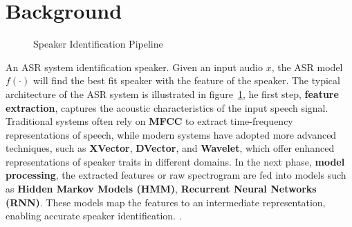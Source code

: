 \documentclass[conference]{IEEEtran}
\begin{document}
\section{Background}
\begin{figure}[H]
    \centering
    \label{fig:speaker_identification_pipeline}
    \caption{Speaker Identification Pipeline}
\end{figure}

An ASR system identification speaker. Given an input audio \(x\), the ASR model \(f(\cdot)\) will find the best fit speaker with the feature of the speaker. The typical architecture
of the ASR system is illustrated in figure~\ref{fig:speaker_identification_pipeline}, he first step, \textbf{feature extraction},
captures the acoustic characteristics of the input speech signal. Traditional systems often rely on \textbf{MFCC} to extract time-frequency representations of speech,
while modern systems have adopted more advanced techniques, such as \textbf{XVector}, \textbf{DVector}, and \textbf{Wavelet}, which offer enhanced representations of
speaker traits in different domains. In the next phase, \textbf{model processing}, the extracted features or raw spectrogram are fed into models such as \textbf{Hidden Markov Models (HMM)},
\textbf{Recurrent Neural Networks (RNN)}. These models map the features to an intermediate representation,
enabling accurate speaker identification. \cite{davis1980comparison, Snyder2018Xvectors,wan2018dvector,graves2013speech}.
\end{document}
